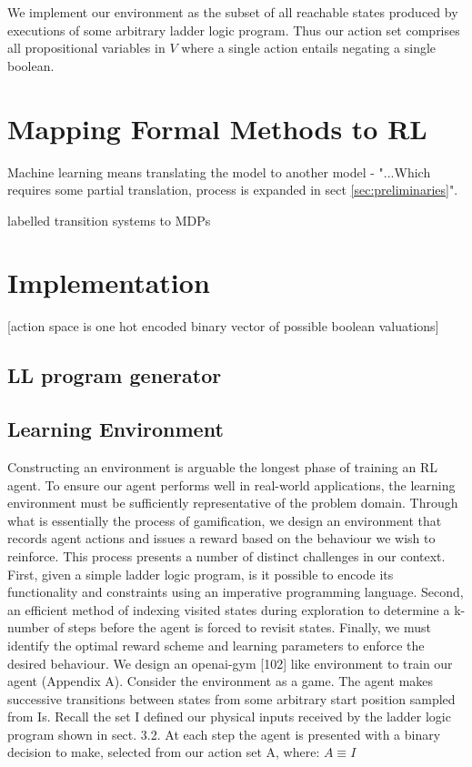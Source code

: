 \documentclass[runningheads]{llncs}
\begin{document}
We implement our environment as the subset of all reachable states produced by executions of some arbitrary ladder logic program.  Thus our action set comprises all propositional variables in $V$ where a single action entails negating a single boolean.




\section{Mapping Formal Methods to RL}
Machine learning means translating the model to another model - "...Which requires some partial translation, process is expanded in sect \ref{sec:preliminaries}".

labelled transition systems to MDPs

\section{Implementation}
[action space is one hot encoded binary vector of possible boolean valuations]
\subsection{LL program generator}
\subsection{Learning Environment}
Constructing an environment is arguable the longest phase of training an RL agent. To
ensure our agent performs well in real-world applications, the learning environment must
be sufficiently representative of the problem domain. Through what is essentially the
process of gamification, we design an environment that records agent actions and issues a
reward based on the behaviour we wish to reinforce. This process presents a number of
distinct challenges in our context. First, given a simple ladder logic program, is it possible
to encode its functionality and constraints using an imperative programming language.
Second, an efficient method of indexing visited states during exploration to determine a
k-number of steps before the agent is forced to revisit states. Finally, we must identify the
optimal reward scheme and learning parameters to enforce the desired behaviour. We design an openai-gym [102] like environment to train our agent (Appendix A).
Consider the environment as a game. The agent makes successive transitions between
states from some arbitrary start position sampled from Is. Recall the set I  defined our physical inputs received by the ladder logic program shown in sect. 3.2. At each step the
agent is presented with a binary decision to make, selected from our action set A, where: $A \equiv I$
\end{document}
